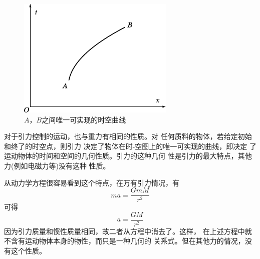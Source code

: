 \begin{figure}
  \centering
  \includegraphics{figure/fig04.08}
  \caption{$ A $，$ B $之间唯一可实现的时空曲线}
  \label{fig:04.08}
\end{figure}
对于引力控制的运动，也与重力有相同的性质。对
任何质料的物体，若给定初始和终了的时空点，则引力
决定了物体在时-空图上的唯一可实现的曲线，即决定
了运动物体的时间和空间的几何性质。引力的这种几何
性是引力的最大特点，其他力(例如电磁力等)没有这种
性质。

从动力学方程很容易看到这个特点，在万有引力情况，有
\begin{equation*}
  m a = \frac { G m M } { r ^ { 2 } }
\end{equation*}
可得
\begin{equation*}
  a = \frac { G M } { r ^ { 2 } }
\end{equation*}
因为引力质量和惯性质量相同，故二者从方程中消去了。这样，
\clearpage\noindent
在上述方程中就不含有运动物体本身的物性，而只是一种几何的
关系式。但在其他力的情况，没有这个性质。